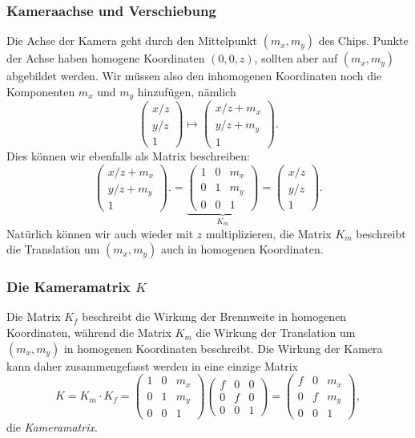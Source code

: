 \subsubsection{Kameraachse und Verschiebung}
Die Achse der Kamera geht durch den Mittelpunkt $(m_x,m_y)$ des Chips.
Punkte der Achse haben homogene Koordinaten $(0,0,z)$, sollten aber
auf $(m_x,m_y)$ abgebildet werden.
Wir müssen also den inhomogenen Koordinaten noch die Komponenten
$m_x$ und $m_y$ hinzufügen, nämlich
\[
\begin{pmatrix} x/z \\ y/z \\ 1 \end{pmatrix}
\mapsto
\begin{pmatrix} x/z +m_x\\ y/z +m_y\\ 1 \end{pmatrix}.
\]
Dies können wir ebenfalls als Matrix beschreiben:
\[
\begin{pmatrix} x/z +m_x\\ y/z +m_y\\ 1 \end{pmatrix}.
=
\underbrace{
\begin{pmatrix}
1&0&m_x\\
0&1&m_y\\
0&0&1
\end{pmatrix}
}_{\displaystyle K_m}
=
\begin{pmatrix} x/z \\ y/z \\ 1 \end{pmatrix}.
\]
Natürlich können wir auch wieder mit $z$ multiplizieren, die Matrix
$K_m$ beschreibt die Translation um $(m_x,m_y)$ auch in homogenen
Koordinaten.

\subsubsection{Die Kameramatrix $K$}
Die Matrix $K_f$ beschreibt die Wirkung der Brennweite in homogenen
Koordinaten, während die Matrix $K_m$ die Wirkung der Translation um
$(m_x,m_y)$ in homogenen Koordinaten beschreibt.
Die Wirkung der Kamera kann daher zusammengefasst werden in eine einzige
Matrix
\[
K
=
K_m\cdot K_f
=
\begin{pmatrix}
1&0&m_x\\
0&1&m_y\\
0&0&1
\end{pmatrix}
\begin{pmatrix}
f&0&0\\
0&f&0\\
0&0&1
\end{pmatrix}
=
\begin{pmatrix}
f&0&m_x\\
0&f&m_y\\
0&0&1
\end{pmatrix},
\]
die {\em Kameramatrix}.
%

